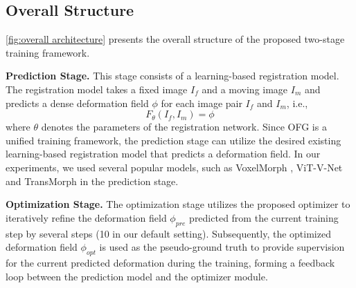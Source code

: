 \documentclass[10pt,twocolumn,letterpaper]{article}
\begin{document}
\subsection{Overall Structure}\label{sec:optron architecture}

\cref{fig:overall architecture} presents the overall structure of the proposed two-stage training framework. 

\textbf{Prediction Stage.} This stage consists of a learning-based registration model. The registration model takes a fixed image $I_{f}$ and a moving image $I_{m}$ and predicts a dense deformation field $\phi$ for each image pair $I_{f}$ and $I_{m}$, i.e.,
\begin{equation}
    F_{\theta}(I_{f}, I_{m}) = \phi
\end{equation}
where $\theta$ denotes the parameters of the registration network. 
Since OFG is a unified training framework, the prediction stage can utilize the desired existing learning-based registration model that predicts a deformation field. In our experiments, we used several popular models, such as VoxelMorph \cite{Balakrishnan_2019}, ViT-V-Net \cite{chen2021vitvnet} and TransMorph \cite{Chen_2022} in the prediction stage.


\textbf{Optimization Stage.} The optimization stage utilizes the proposed optimizer to iteratively refine the deformation field $\phi_{pre}$ predicted from the current training step by several steps (10 in our default setting). Subsequently, the optimized deformation field $\phi_{opt}$ is used as the pseudo-ground truth to provide supervision for the current predicted deformation during the training, forming a feedback loop between the prediction model and the optimizer module. 
\end{document}
